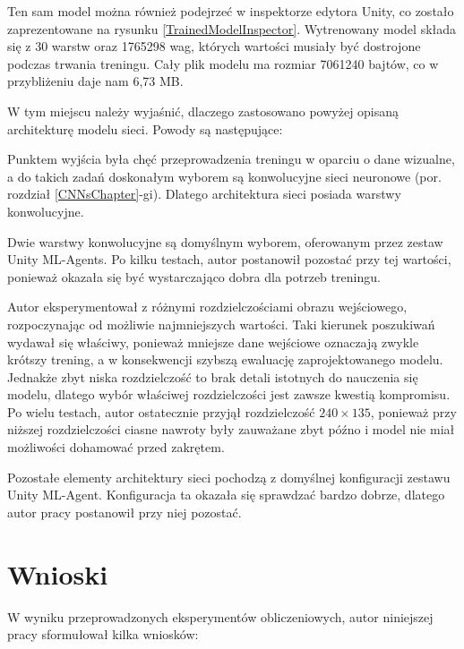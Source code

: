 Ten sam model można również podejrzeć w inspektorze edytora Unity, co zostało zaprezentowane na rysunku \ref{TrainedModelInspector}. Wytrenowany model składa się z 30 warstw oraz 1765298 wag, których wartości musiały być dostrojone podczas trwania treningu. Cały plik modelu ma rozmiar 7061240 bajtów, co w przybliżeniu daje nam 6,73 MB.

W tym miejscu należy wyjaśnić, dlaczego zastosowano powyżej opisaną architekturę modelu sieci. Powody są następujące:
\begin{enumerate*}
\item Punktem wyjścia była chęć przeprowadzenia treningu w oparciu o dane wizualne, a do takich zadań doskonałym wyborem są konwolucyjne sieci neuronowe (por. rozdział \ref{CNNsChapter}-gi). Dlatego architektura sieci posiada warstwy konwolucyjne.
\item Dwie warstwy konwolucyjne są domyślnym wyborem, oferowanym przez zestaw Unity ML-Agents. Po  kilku testach, autor postanowił pozostać przy tej wartości, ponieważ okazała się być wystarczająco dobra dla potrzeb treningu.
\item Autor eksperymentował z różnymi rozdzielczościami obrazu wejściowego, rozpoczynając od możliwie najmniejszych wartości. Taki kierunek poszukiwań wydawał się właściwy, ponieważ mniejsze dane wejściowe oznaczają zwykle krótszy trening, a w konsekwencji szybszą ewaluację zaprojektowanego modelu. Jednakże zbyt niska rozdzielczość to brak detali istotnych do nauczenia się modelu, dlatego wybór właściwej rozdzielczości jest zawsze kwestią kompromisu. Po wielu testach, autor ostatecznie przyjął rozdzielczość $240 \times 135$, ponieważ przy niższej rozdzielczości ciasne nawroty były zauważane zbyt późno i model nie miał możliwości dohamować przed zakrętem.
\item Pozostałe elementy architektury sieci pochodzą z domyślnej konfiguracji zestawu Unity ML-Agent. Konfiguracja ta okazała się sprawdzać bardzo dobrze, dlatego autor pracy postanowił przy niej pozostać.
\end{enumerate*}

\section{Wnioski}
W wyniku przeprowadzonych eksperymentów obliczeniowych, autor niniejszej pracy sformułował kilka wniosków:

